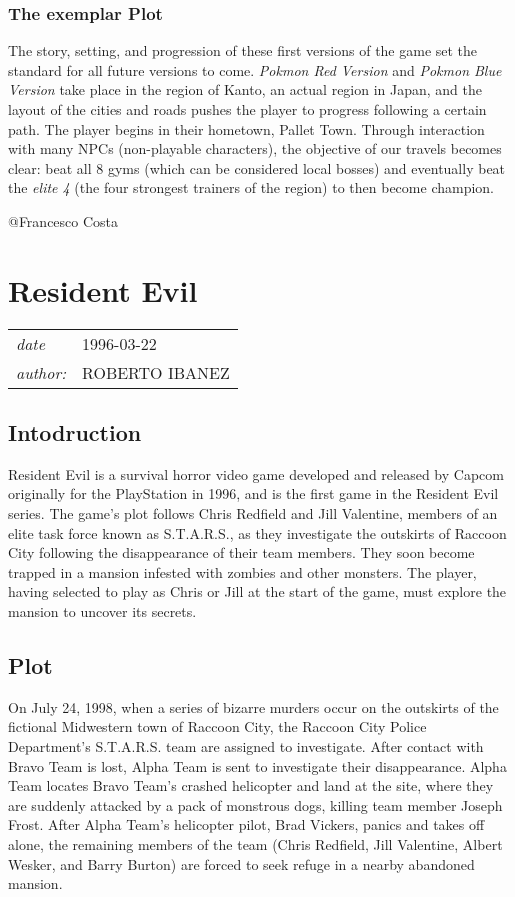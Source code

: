 \documentclass[a4paper,10pt]{book}
\newcommand{\pageHeader}[4]{
    \section{#1}
    \vspace{-0.3cm}
    \begin{table}[h!]
     \begin{tabular}{ll}
        \hline
        \textit{date} & #2 \\
        \textit{author: } & #3\\
        \hline
     \end{tabular}
    \end{table}
    \vspace{-0.3cm}
}
\begin{document}
 
 \subsubsection{The exemplar Plot }
 
          The story, setting, and progression of these first versions of the game set the standard
          for all future versions to come.  \textit{Pokmon Red Version } and  \textit{Pokmon Blue Version }
          take place in the region of Kanto, an actual region in Japan, and the layout of the cities
          and roads pushes the player to progress following a certain path. The player begins in their
          hometown, Pallet Town. Through interaction with many NPCs (non-playable characters), the
          objective of our travels becomes clear: beat all 8 gyms (which can be considered local bosses)
          and eventually beat the  \textit{elite 4 } (the four strongest trainers of the region) to then become champion.
         
 
 
 @Francesco Costa 
 
 \newpage\pageHeader{Resident Evil}{1996-03-22}{ROBERTO IBANEZ}{Resident Evil, horror video game}
 \subsection{ Intodruction }
 
            Resident Evil is a survival horror video game developed and released by Capcom originally for the PlayStation in 1996, and is the first game in the Resident Evil series. 
            The game's plot follows Chris Redfield and Jill Valentine, members of an elite task force known as S.T.A.R.S., as they investigate the outskirts of Raccoon City following the disappearance of their team members. 
            They soon become trapped in a mansion infested with zombies and other monsters. 
            The player, having selected to play as Chris or Jill at the start of the game, must explore the mansion to uncover its secrets.
         
 \subsection{Plot }
 
            On July 24, 1998, when a series of bizarre murders occur on the outskirts of the fictional Midwestern town of Raccoon City, the Raccoon City Police Department's S.T.A.R.S. team are assigned to investigate. 
            After contact with Bravo Team is lost, Alpha Team is sent to investigate their disappearance. 
            Alpha Team locates Bravo Team's crashed helicopter and land at the site, where they are suddenly attacked by a pack of monstrous dogs, killing team member Joseph Frost. After Alpha Team's helicopter pilot, Brad Vickers, panics and takes off alone, the remaining members of the team (Chris Redfield, Jill Valentine, Albert Wesker, and Barry Burton) are forced to seek refuge in a nearby abandoned mansion.
         
\end{document}
